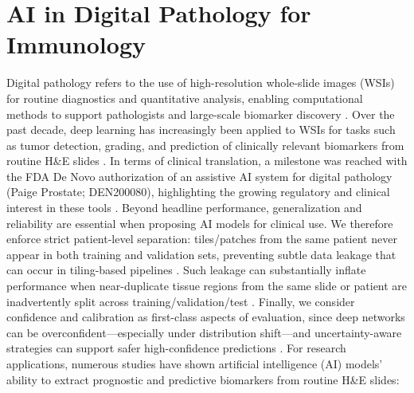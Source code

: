 \section{AI in Digital Pathology for Immunology}
\label{sec:AIinDigPat}
Digital pathology refers to the use of high-resolution whole-slide images (WSIs) for routine diagnostics and quantitative analysis, enabling computational methods to support pathologists and large-scale biomarker discovery \cite{tizhoosh}. Over the past decade, deep learning has increasingly been applied to WSIs for tasks such as tumor detection, grading, and prediction of clinically relevant biomarkers from routine H\&E slides \cite{tizhoosh} \cite{asif} . In terms of clinical translation, a milestone was reached with the FDA De Novo authorization of an assistive AI system for digital pathology (Paige Prostate; DEN200080), highlighting the growing regulatory and clinical interest in these tools \cite{fda}. Beyond headline performance, generalization and reliability are essential when proposing AI models for clinical use. We therefore enforce strict patient-level separation: tiles/patches from the same patient never appear in both training and validation sets, preventing subtle data leakage that can occur in tiling-based pipelines \cite{bussola}. Such leakage can substantially inflate performance when near-duplicate tissue regions from the same slide or patient are inadvertently split across training/validation/test \cite{bussola}. 
Finally, we consider confidence and calibration as first-class aspects of evaluation, since deep networks can be overconfident—especially under distribution shift—and uncertainty-aware strategies can support safer high-confidence predictions \cite{dolezal}.
For research applications, numerous studies have shown artificial intelligence (AI) models' ability to extract prognostic and predictive biomarkers from routine H\&E slides:

